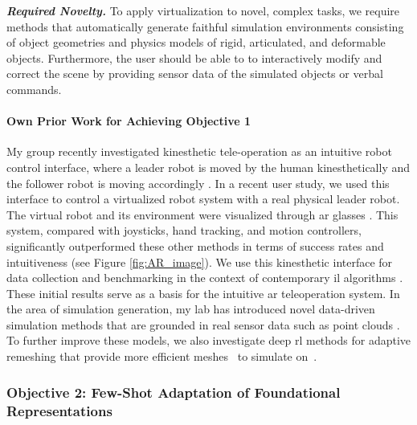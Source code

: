 \documentclass{erc-B2}
\begin{document}
\textit{\textbf{Required Novelty.}} To apply virtualization to novel, complex tasks, we require methods that automatically generate faithful simulation environments consisting of object geometries and physics models of rigid, articulated, and deformable objects. Furthermore, the user should be able to to interactively modify and correct the scene by providing sensor data of the simulated objects or verbal commands.%


\paragraph{Own Prior Work for Achieving  Objective 1}
My group recently investigated kinesthetic tele-operation as an intuitive robot control interface, where a leader robot is moved by the human kinesthetically and the follower robot is moving accordingly \cite{Sing_teleop}. In a recent user study, we used this interface to control a virtualized robot system with a real physical leader robot. The virtual robot and its environment were visualized through \gls*{ar} glasses \cite{jiang2023user}. This system, compared with joysticks, hand tracking, and motion controllers, significantly outperformed these other methods in terms of success rates and intuitiveness (see Figure \ref{fig:AR_image}). We use this kinesthetic interface for data collection and benchmarking in the context of contemporary \gls*{il} algorithms \cite{David2024}. These initial results serve as a basis for the intuitive \gls*{ar} teleoperation system. In the area of simulation generation, my lab has introduced novel data-driven simulation methods that are grounded in real sensor data such as point clouds \cite{linkerhagnerFSM23}. To further improve these models, we also investigate deep \gls*{rl} methods for adaptive remeshing that provide more efficient meshes~\cite{freymuth2023asmr} to simulate on~\cite{wu2023learning}.



 
\subsubsection{Objective 2: Few-Shot Adaptation of Foundational Representations}
\end{document}
